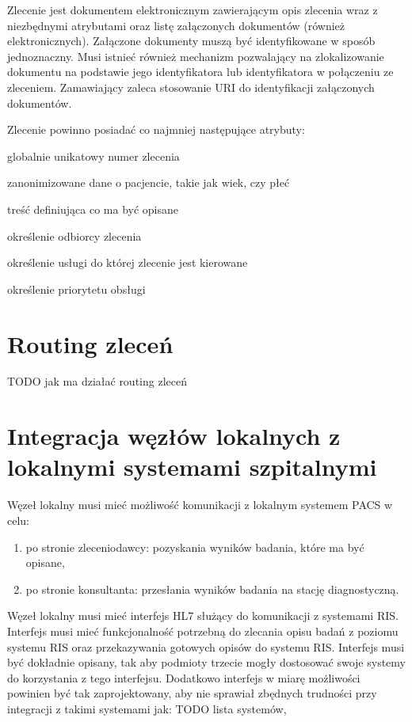 \documentclass[a4paper]{report}
\begin{document}
Zlecenie jest dokumentem elektronicznym zawierającym opis zlecenia wraz z niezbędnymi atrybutami oraz listę załączonych dokumentów (również elektronicznych). Załączone dokumenty muszą być identyfikowane w sposób jednoznaczny. Musi istnieć również mechanizm pozwalający na zlokalizowanie dokumentu na podstawie jego identyfikatora lub identyfikatora w połączeniu ze zleceniem. Zamawiający zaleca stosowanie URI do identyfikacji załączonych dokumentów.

Zlecenie powinno posiadać co najmniej następujące atrybuty:
\begin{enumerate*}
\item globalnie unikatowy numer zlecenia
\item zanonimizowane dane o pacjencie, takie jak wiek, czy płeć
\item treść definiująca co ma być opisane
\item określenie odbiorcy zlecenia
\item określenie usługi do której zlecenie jest kierowane
\item określenie priorytetu obsługi
\end{enumerate*}

\section{Routing zleceń}

TODO jak ma działać routing zleceń

\section{Integracja węzłów lokalnych z lokalnymi systemami szpitalnymi}

Węzeł lokalny musi mieć możliwość komunikacji z lokalnym systemem PACS w celu:
\begin{enumerate}
 \item po stronie zleceniodawcy: pozyskania wyników badania, które ma być opisane,
 \item po stronie konsultanta: przesłania wyników badania na stację diagnostyczną.
\end{enumerate}

Węzeł lokalny musi mieć interfejs HL7 służący do komunikacji z systemami RIS. Interfejs musi mieć funkcjonalność potrzebną do zlecania opisu badań z poziomu systemu RIS oraz przekazywania gotowych opisów do systemu RIS. Interfejs musi być dokładnie opisany, tak aby podmioty trzecie mogły dostosować swoje systemy do korzystania z tego interfejsu. Dodatkowo interfejs w miarę możliwości powinien być tak zaprojektowany, aby nie sprawiał zbędnych trudności przy integracji z takimi systemami jak: TODO lista systemów, 
\end{document}
